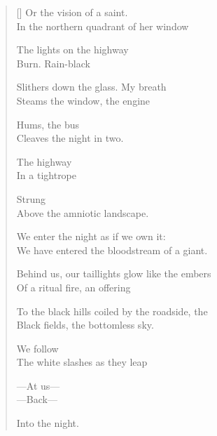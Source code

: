 \begin{verse}[\versewidth]
Or the vision of a saint.\\
In the northern quadrant of her window

The lights on the highway\\
Burn.     Rain-black

Slithers down the glass.     My breath\\
Steams the window, the engine

Hums, the bus\\
Cleaves the night in two.

The highway\\
In a tightrope

Strung\\
Above the amniotic landscape.

We enter the night as if we own it:\\
We have entered the bloodstream of a giant.

Behind us, our taillights glow like the embers\\
Of a ritual fire, an offering

To the black hills coiled by the roadside, the\\
Black fields, the bottomless sky.

We follow\\
The white slashes as they leap

---At us---\\
---Back---

Into the night.
\end{verse}
